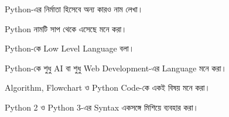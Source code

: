 

\begin{compacttwocolpoints}

\item Python-এর নির্মাতা হিসেবে অন্য কারও নাম লেখা।

\item Python নামটি সাপ থেকে এসেছে মনে করা।

\item Python-কে Low Level Language বলা।

\item Python-কে শুধু AI বা শুধু Web Development-এর
Language মনে করা।

\item Algorithm, Flowchart ও Python Code-কে একই বিষয় মনে করা।

\item Python 2 ও Python 3-এর Syntax একসঙ্গে মিশিয়ে ব্যবহার করা।

\end{compacttwocolpoints}


